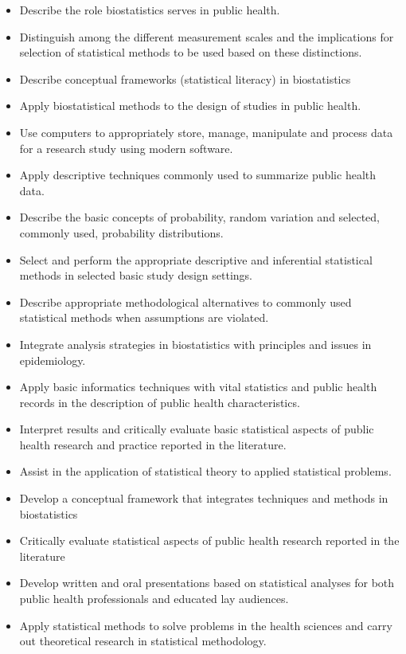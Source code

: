 \documentclass[10pt]{article}
\begin{document}
  
  \clearpage
\bigskip
{}
\begin{itemize}
\item   Describe the role biostatistics serves in public health.
\item Distinguish among the different measurement scales and the implications for selection of statistical methods to be used based on these distinctions.
\item Describe conceptual frameworks (statistical literacy) in biostatistics
\item Apply biostatistical methods to the design of studies in public health.
\item Use computers to appropriately store, manage, manipulate and process data for a research study using modern software.
\item Apply descriptive techniques commonly used to summarize public health data. 
\item Describe the basic concepts of probability, random variation and selected, commonly used, probability distributions.
\item Select and perform the appropriate descriptive and inferential statistical methods in selected basic study design settings.
\item Describe appropriate methodological alternatives to commonly used statistical methods when assumptions are violated.
\item Integrate analysis strategies in biostatistics with principles and issues in epidemiology.
\item Apply basic informatics techniques with vital statistics and public health records in the description of public health characteristics.
\item Interpret results and critically evaluate basic statistical aspects of public health research and practice reported in the literature.
\item Assist in the application of statistical theory to applied statistical problems.
\item Develop a conceptual framework that integrates techniques and methods in biostatistics 
\item Critically evaluate statistical aspects of public health research reported in the literature
\item Develop written and oral presentations based on statistical analyses for both public health professionals and educated lay audiences.
\item Apply statistical methods to solve problems in the health sciences and carry out theoretical research in statistical methodology.
\end{itemize}
  
\end{document}
